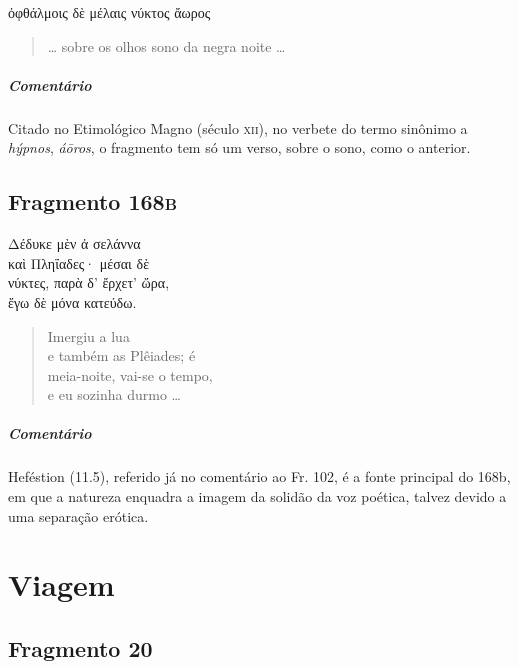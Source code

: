 {\begin{gkverse}
ὀφθάλμοις δὲ μέλαις νύκτος ἄωρος
\end{gkverse}

\begin{verse}
\ldots{} sobre os olhos sono da negra noite \ldots{}
\end{verse}

 {\paragraph{Comentário} Citado no Etimológico Magno (século \textsc{xii}), no verbete do termo sinônimo a \textit{hýpnos}, \textit{áōros}, o fragmento tem só um verso, sobre o sono, como o anterior.}


\section{Fragmento 168\textsc{b}}

\begin{gkverse}
Δέδυκε μὲν ἀ σελάννα\\
καὶ Πληΐαδες· μέσαι δὲ\\
νύκτες, παρὰ δ’ ἔρχετ’ ὤρα,\\
ἔγω δὲ μόνα κατεύδω.
\end{gkverse}

\begin{verse}
Imergiu a lua\\
e também as Plêiades; é\\
meia-noite, vai-se o tempo,\\
e eu sozinha durmo \ldots{}
\end{verse}

{\paragraph{Comentário} Heféstion (11.5), referido já no comentário ao Fr. 102, é a fonte principal do 168b, em que a natureza enquadra a imagem da solidão da voz poética, talvez devido a uma separação erótica.}


\chapter{Viagem}

\section{Fragmento 20}

}
